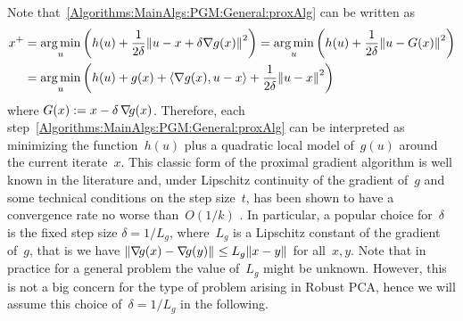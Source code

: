 Note that~\eqref{Algorithms:MainAlgs:PGM:General:proxAlg} can be written as
%
\begin{align}
\begin{split}
x^+ &= \operatorname*{arg\,min}_u \left( h(u) + \frac{1}{2\delta}{\left\|u-x+\delta\nabla g(x)\right\|}_{}^{2} \right) = \operatorname*{arg\,min}_u \left( h(u) +\frac{1}{2\delta} {\left\|u-G(x)\right\|}_{}^{2} \right) \\
&= \operatorname*{arg\,min}_u \left( h(u) +g(x) + \langle \nabla g(x),u-x\rangle + \frac{1}{2\delta}{\left\|u-x\right\|}_{}^{2} \right)
\end{split}
\label{Algorithms:MainAlgs:PGM:General:proxAlgRewritten}
\end{align}
%
where $G(x) := x-\delta\operatorname{\nabla\!\!} g(x)$. Therefore, each step~\eqref{Algorithms:MainAlgs:PGM:General:proxAlg} can be interpreted as minimizing the function~$h(u)$ plus a quadratic local model of~$g(u)$ around the current iterate~$x$. This classic form of the proximal gradient algorithm is well known in the literature and, under Lipschitz continuity of the gradient of~$g$ and some technical conditions on the step size~$t$, has been shown to have a convergence rate no worse than~$O(1/k)$ \cite{Nesterov:2007kx}. In particular, a popular choice for~$\delta$ is the fixed step size $\delta = 1/L_g$, where~$L_g$ is a Lipschitz constant of the gradient of~$g$, that is we have ${\left\|\operatorname{\nabla\!\!} g(x) -\operatorname{\nabla\!\!} g(y)\right\|}_{}^{} \leq L_g {\left\|x-y\right\|}_{}^{}$ for all~$x,y$. Note that in practice for a general problem the value of~$L_g$ might be unknown. However, this is not a big concern for the type of problem arising in Robust PCA, hence we will assume this choice of~$\delta=1/L_g$ in the following.

